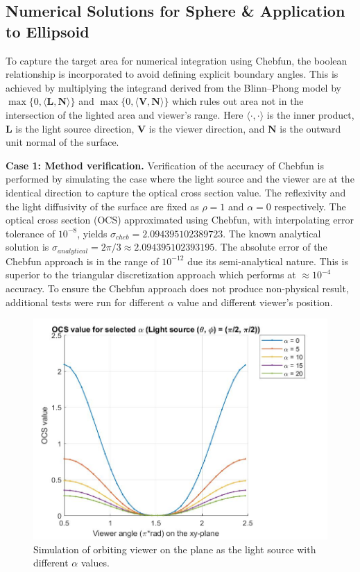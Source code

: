 \documentclass[11pt,reqno]{amsart}
\theoremstyle{definition}
\begin{document}
\subsection{Numerical Solutions for Sphere \& Application to Ellipsoid}

To capture the target area for numerical integration using Chebfun, the boolean relationship is incorporated to avoid defining explicit boundary angles. This is achieved by multiplying the integrand derived from the Blinn--Phong model by $\max\{0, \langle \mathbf{L},\mathbf{N}\rangle\}$ and $\max\{0,\langle \mathbf{V},\mathbf{N}\rangle\}$ which rules out area not in the intersection of the lighted area and viewer's range. Here $\langle\cdot, \cdot\rangle$ is the inner product, $\mathbf{L}$ is the light source direction, $\mathbf{V}$ is the viewer direction, and $\mathbf{N}$ is the outward unit normal of the surface.

{\bf Case 1: Method verification.} Verification of the accuracy of Chebfun is performed by simulating the case where the light source and the viewer are at the identical direction to capture the optical cross section value. The reflexivity and the light diffusivity of the surface are fixed as $\rho = 1$ and $\alpha =0$ respectively. The optical cross section (OCS) approximated using Chebfun, with interpolating error tolerance of $10^{-8}$, yields $\sigma_{cheb} = 2.094395102389723$. The known analytical solution is $\sigma_{analytical} = 2\pi/3 \approx 2.094395102393195$. The absolute error of the Chebfun approach is in the range of $10^{-12}$ due its semi-analytical nature. This is superior to the triangular discretization approach which performs at $\approx 10^{-4}$ accuracy. To ensure the Chebfun approach does not produce non-physical result, additional tests were run for different $\alpha$ value and different viewer's position.

\begin{figure}[h]
\centering \includegraphics[scale=0.4]{./figs/OCS_parallel_plane}    
\caption{Simulation of orbiting viewer on the plane as the light source with different $\alpha$ values.}    
\label{OCSParallelPlane}
\end{figure}
\end{document}
